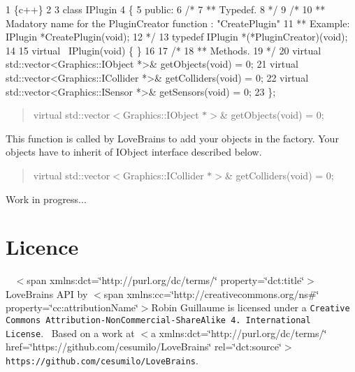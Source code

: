 \begin{DoxyCode}
1 \{c++\}
2 
3   class IPlugin
4   \{
5   public:
6     /*
7     ** Typedef.
8     */
9     /*
10     ** Madatory name for the PluginCreator function : "CreatePlugin"
11     ** Example: IPlugin *CreatePlugin(void);
12     */
13     typedef IPlugin *(*PluginCreator)(void);
14 
15     virtual ~IPlugin(void) \{ \}
16 
17     /*
18     ** Methods.
19     */
20     virtual std::vector<Graphics::IObject *>&   getObjects(void) = 0;
21     virtual std::vector<Graphics::ICollider *>& getColliders(void) = 0;
22     virtual std::vector<Graphics::ISensor *>&   getSensors(void) = 0;
23   \};
\end{DoxyCode}


\begin{quote}
virtual std\+::vector$<$\+Graphics\+::\+I\+Object $\ast$$>$\& get\+Objects(void) = 0; \end{quote}


This function is called by Love\+Brains to add your objects in the factory. Your objects have to inherit of I\+Object interface described below.

\begin{quote}
virtual std\+::vector$<$\+Graphics\+::\+I\+Collider $\ast$$>$\& get\+Colliders(void) = 0; \end{quote}


Work in progress...

\section*{Licence}

{\tt }~\newline
$<$span xmlns\+:dct=\char`\"{}http\+://purl.\+org/dc/terms/\char`\"{} property=\char`\"{}dct\+:title\char`\"{}$>$Love\+Brains A\+P\+I by $<$span xmlns\+:cc=\char`\"{}http\+://creativecommons.\+org/ns\#\char`\"{} property=\char`\"{}cc\+:attribution\+Name\char`\"{}$>$Robin Guillaume is licensed under a {\tt Creative Commons Attribution-\/\+Non\+Commercial-\/\+Share\+Alike 4. International License}.~\newline
Based on a work at $<$a xmlns\+:dct=\char`\"{}http\+://purl.\+org/dc/terms/\char`\"{} href=\char`\"{}https\+://github.\+com/cesumilo/\+Love\+Brains\char`\"{} rel=\char`\"{}dct\+:source\char`\"{}$>${\tt https\+://github.\+com/cesumilo/\+Love\+Brains}. 